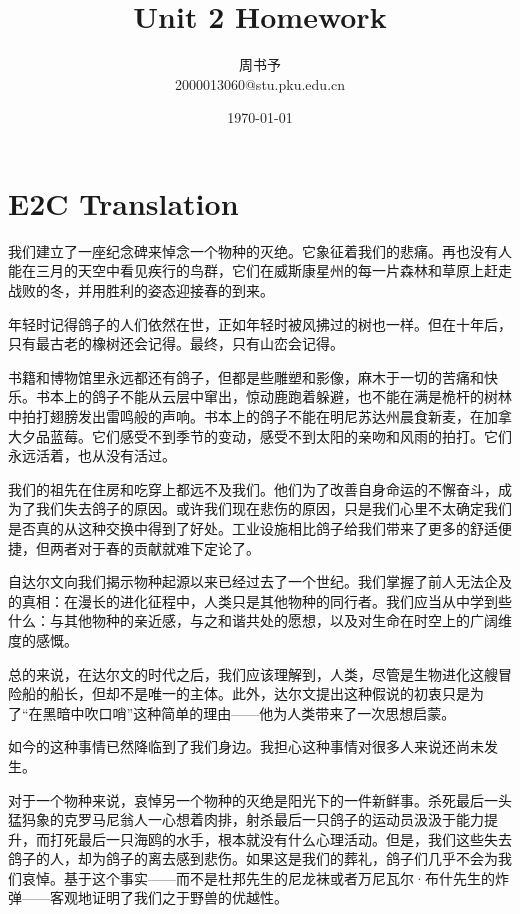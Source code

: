 \documentclass[8pt]{article}
\title{\heiti\zihao{1} Unit 2 Homework}
\author{\kaishu\zihao{-3} 周书予\\2000013060@stu.pku.edu.cn}
\date{\today}
\begin{document}
\large
\pagestyle{fancy}


\maketitle

\section{E2C Translation}

	我们建立了一座纪念碑来悼念一个物种的灭绝。它象征着我们的悲痛。再也没有人能在三月的天空中看见疾行的鸟群，它们在威斯康星州的每一片森林和草原上赶走战败的冬，并用胜利的姿态迎接春的到来。
	
	年轻时记得鸽子的人们依然在世，正如年轻时被风拂过的树也一样。但在十年后，只有最古老的橡树还会记得。最终，只有山峦会记得。
	
	书籍和博物馆里永远都还有鸽子，但都是些雕塑和影像，麻木于一切的苦痛和快乐。书本上的鸽子不能从云层中窜出，惊动鹿跑着躲避，也不能在满是桅杆的树林中拍打翅膀发出雷鸣般的声响。书本上的鸽子不能在明尼苏达州晨食新麦，在加拿大夕品蓝莓。它们感受不到季节的变动，感受不到太阳的亲吻和风雨的拍打。它们永远活着，也从没有活过。

	我们的祖先在住房和吃穿上都远不及我们。他们为了改善自身命运的不懈奋斗，成为了我们失去鸽子的原因。或许我们现在悲伤的原因，只是我们心里不太确定我们是否真的从这种交换中得到了好处。工业设施相比鸽子给我们带来了更多的舒适便捷，但两者对于春的贡献就难下定论了。

	自达尔文向我们揭示物种起源以来已经过去了一个世纪。我们掌握了前人无法企及的真相：在漫长的进化征程中，人类只是其他物种的同行者。我们应当从中学到些什么：与其他物种的亲近感，与之和谐共处的愿想，以及对生命在时空上的广阔维度的感慨。

	总的来说，在达尔文的时代之后，我们应该理解到，人类，尽管是生物进化这艘冒险船的船长，但却不是唯一的主体。此外，达尔文提出这种假说的初衷只是为了“在黑暗中吹口哨”这种简单的理由——他为人类带来了一次思想启蒙。

	如今的这种事情已然降临到了我们身边。我担心这种事情对很多人来说还尚未发生。

	对于一个物种来说，哀悼另一个物种的灭绝是阳光下的一件新鲜事。杀死最后一头猛犸象的克罗马尼翁人一心想着肉排，射杀最后一只鸽子的运动员汲汲于能力提升，而打死最后一只海鸥的水手，根本就没有什么心理活动。但是，我们这些失去鸽子的人，却为鸽子的离去感到悲伤。如果这是我们的葬礼，鸽子们几乎不会为我们哀悼。基于这个事实——而不是杜邦先生的尼龙袜或者万尼瓦尔·布什先生的炸弹——客观地证明了我们之于野兽的优越性。
\end{document}
